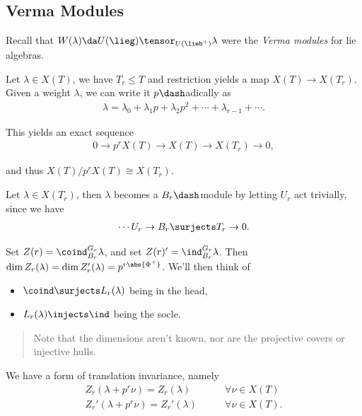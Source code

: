 \hypertarget{verma-modules}{%
\subsection{Verma Modules}\label{verma-modules}}

Recall that \(W(\lambda) \da U(\lieg) \tensor_{U(\lieb^+)} \lambda\)
were the \emph{Verma modules} for lie algebras.

Let \(\lambda \in X(T)\), we have \(T_r \leq T\) and restriction yields
a map \(X(T) \to X(T_r)\). Given a weight \(\lambda\), we can write it
\(p\dash\)adically as
\begin{align*}  
\lambda = \lambda_0 + \lambda_1 p + \lambda_2 p^2 + \cdots + \lambda_{r-1} + \cdots
.\end{align*}

This yields an exact sequence
\begin{align*}  
0 \to p^r X(T) \to X(T) \to X(T_r) \to 0
,\end{align*}

and thus \(X(T) / p^r X(T) \cong X(T_r)\).

Let \(\lambda \in X(T_r)\), then \(\lambda\) becomes a
\(B_r\dash\)module by letting \(U_r\) act trivially, since we have
\begin{align*}  
\cdots U_r \to B_r \surjects T_r \to 0
.\end{align*}

Set \(Z(r) = \coind_{B_r}^{G_r} \lambda\), and set
\(Z(r)' = \ind_{B_r}^{G_r} \lambda\). Then
\(\dim Z_r(\lambda) = \dim Z_r'(\lambda) = p^{r\abs{\Phi^+}}\). We'll
then think of

\begin{itemize}
\tightlist
\item
  \(\coind \surjects L_r(\lambda)\) being in the head,
\item
  \(L_r(\lambda) \injects \ind\) being the socle.
\end{itemize}

\begin{quote}
Note that the dimensions aren't known, nor are the projective covers or
injective hulls.
\end{quote}

We have a form of translation invariance, namely
\begin{align*}  
Z_r(\lambda + p^r\nu) = Z_r(\lambda) \qquad &\forall \nu \in X(T) \\
Z_r'(\lambda + p^r\nu) = Z_r'(\lambda) \qquad &\forall \nu \in X(T)
.\end{align*}

